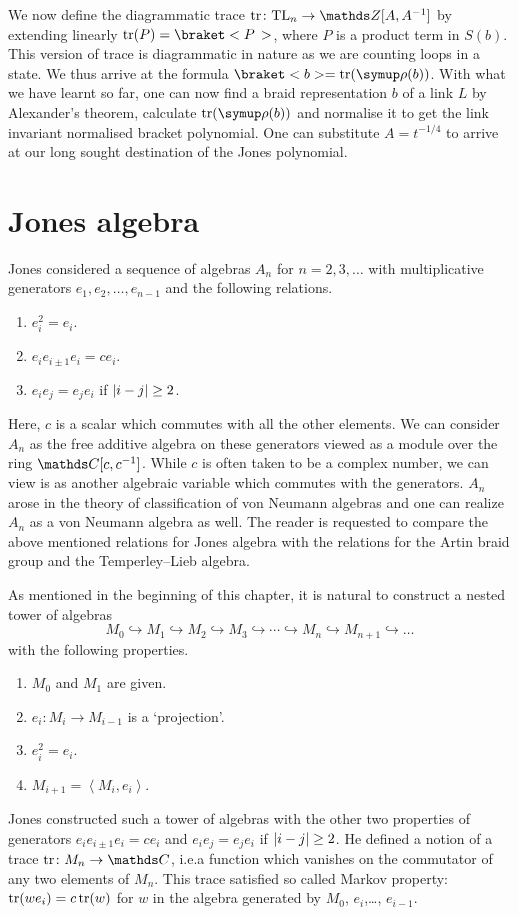 We now define the diagrammatic trace \(\tr \colon \TL_n \rightarrow \Z[A, A^{-1}]\) by extending linearly \(\tr(P) = \braket<P\,>\), where \(P\) is a product term in \(S(b)\). This version of trace is diagrammatic in nature as we are counting loops in a state. We thus arrive at the formula \(\braket<b> = \tr(\operatorname{\uprho}(b))\). With what we have learnt so far, one can now find a braid representation \(b\) of a link \(L\) by Alexander's theorem, calculate \(\tr(\operatorname{\uprho}(b))\) and normalise it to get the link invariant normalised bracket polynomial. One can substitute \(A = t^{-1/4}\) to arrive at our long sought destination of the Jones polynomial.

\section{Jones algebra}

Jones considered a sequence of algebras \(A_n\) for \(n = 2,3,\ldots\) with multiplicative generators \(e_1, e_2,\ldots, e_{n-1}\) and the following relations.
\begin{enumerate}
    \item \(e_i^2 = e_i\).
	\item \(e_ie_{i\pm 1} e_i = ce_i\).
	\item \(e_ie_j = e_je_i\) if \(\lvert i-j\rvert \geq 2\).
\end{enumerate}
Here, \(c\) is a scalar which commutes with all the other elements. We can consider \(A_n\) as the free additive algebra on these generators viewed as a module over the ring \(\symbb{C}[c,c^{-1}]\). While \(c\) is often taken to be a complex number, we can view is as another algebraic variable which commutes with the generators. \(A_n\) arose in the theory of classification of von Neumann algebras and one can realize \(A_n\) as a von Neumann algebra as well. The reader is requested to compare the above mentioned relations for Jones algebra with the relations for the Artin braid group and the Temperley--Lieb algebra.

As mentioned in the beginning of this chapter, it is natural to construct a nested tower of algebras \[M_0 \hookrightarrow M_1 \hookrightarrow M_2 \hookrightarrow M_3\hookrightarrow \cdots \hookrightarrow M_n \hookrightarrow M_{n+1} \hookrightarrow\ldots\] with the following properties.
\begin{enumerate}
    \item \(M_0\) and \(M_1\) are given.
	\item \(e_i\colon M_i \rightarrow M_{i-1}\) is a `projection'.
	\item \(e_i^2 = e_i\).
	\item \(M_{i+1} = \left\langle M_i,e_i\right\rangle\).
\end{enumerate}
Jones constructed such a tower of algebras with the other two properties of generators \(e_ie_{i\pm 1} e_i = ce_i\) and \(e_ie_j = e_je_i\) if \(\lvert i-j\rvert \geq 2\). He defined a notion of a trace \(\tr\colon M_n \rightarrow \C\), i.e.\@ a function which vanishes on the commutator of any two elements of \(M_n\). This trace satisfied so called Markov property: \(\operatorname{tr}(we_i) = c\operatorname{tr}(w)\) for \(w\) in the algebra generated by \(M_0\), \(e_i\),\ldots, \(e_{i-1}\).


